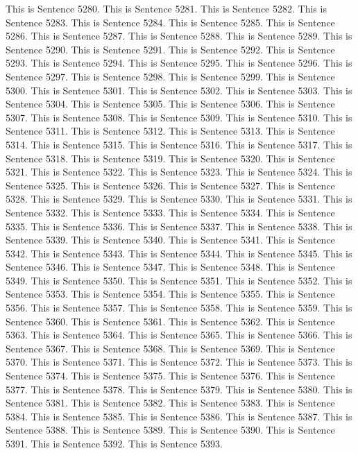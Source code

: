 \documentclass{article}
\begin{document}
This is Sentence 5280.
This is Sentence 5281.
This is Sentence 5282.
This is Sentence 5283.
This is Sentence 5284.
This is Sentence 5285.
This is Sentence 5286.
This is Sentence 5287.
This is Sentence 5288.
This is Sentence 5289.
This is Sentence 5290.
This is Sentence 5291.
This is Sentence 5292.
This is Sentence 5293.
This is Sentence 5294.
This is Sentence 5295.
This is Sentence 5296.
This is Sentence 5297.
This is Sentence 5298.
This is Sentence 5299.
This is Sentence 5300.
This is Sentence 5301.
This is Sentence 5302.
This is Sentence 5303.
This is Sentence 5304.
This is Sentence 5305.
This is Sentence 5306.
This is Sentence 5307.
This is Sentence 5308.
This is Sentence 5309.
This is Sentence 5310.
This is Sentence 5311.
This is Sentence 5312.
This is Sentence 5313.
This is Sentence 5314.
This is Sentence 5315.
This is Sentence 5316.
This is Sentence 5317.
This is Sentence 5318.
This is Sentence 5319.
This is Sentence 5320.
This is Sentence 5321.
This is Sentence 5322.
This is Sentence 5323.
This is Sentence 5324.
This is Sentence 5325.
This is Sentence 5326.
This is Sentence 5327.
This is Sentence 5328.
This is Sentence 5329.
This is Sentence 5330.
This is Sentence 5331.
This is Sentence 5332.
This is Sentence 5333.
This is Sentence 5334.
This is Sentence 5335.
This is Sentence 5336.
This is Sentence 5337.
This is Sentence 5338.
This is Sentence 5339.
This is Sentence 5340.
This is Sentence 5341.
This is Sentence 5342.
This is Sentence 5343.
This is Sentence 5344.
This is Sentence 5345.
This is Sentence 5346.
This is Sentence 5347.
This is Sentence 5348.
This is Sentence 5349.
This is Sentence 5350.
This is Sentence 5351.
This is Sentence 5352.
This is Sentence 5353.
This is Sentence 5354.
This is Sentence 5355.
This is Sentence 5356.
This is Sentence 5357.
This is Sentence 5358.
This is Sentence 5359.
This is Sentence 5360.
This is Sentence 5361.
This is Sentence 5362.
This is Sentence 5363.
This is Sentence 5364.
This is Sentence 5365.
This is Sentence 5366.
This is Sentence 5367.
This is Sentence 5368.
This is Sentence 5369.
This is Sentence 5370.
This is Sentence 5371.
This is Sentence 5372.
This is Sentence 5373.
This is Sentence 5374.
This is Sentence 5375.
This is Sentence 5376.
This is Sentence 5377.
This is Sentence 5378.
This is Sentence 5379.
This is Sentence 5380.
This is Sentence 5381.
This is Sentence 5382.
This is Sentence 5383.
This is Sentence 5384.
This is Sentence 5385.
This is Sentence 5386.
This is Sentence 5387.
This is Sentence 5388.
This is Sentence 5389.
This is Sentence 5390.
This is Sentence 5391.
This is Sentence 5392.
This is Sentence 5393.
\end{document}
